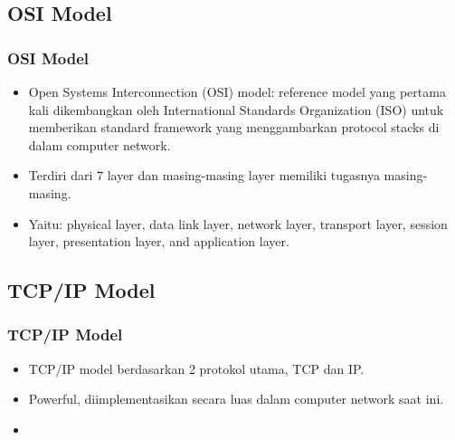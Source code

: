\documentclass[pdflatex,compress]{beamer}
\begin{document}
\subsection{OSI Model}
\begin{frame}
	\frametitle{OSI Model}	
	\begin{itemize}
		\item  Open Systems Interconnection (OSI) model: reference model yang pertama kali dikembangkan oleh International Standards Organization (ISO) untuk memberikan standard framework yang menggambarkan protocol stacks di dalam computer network.
		\item Terdiri dari 7 layer dan masing-masing layer memiliki tugasnya masing-masing.
		\item Yaitu: physical layer, data link layer, network layer, transport layer, session layer, presentation layer, and application layer.
	\end{itemize}	
\end{frame}

\subsection{TCP/IP Model}
\begin{frame}
	\frametitle{TCP/IP Model}
	\begin{itemize}
		\item  TCP/IP model berdasarkan 2 protokol utama, TCP dan IP.
		\item Powerful, diimplementasikan secara luas dalam computer network saat ini.
		\item 
	\end{itemize}	
\end{frame}
\end{document}
